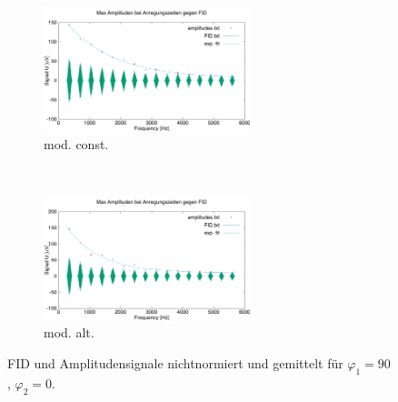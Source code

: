 \documentclass{article}
\begin{document}
        \begin{figure}[H]
            \centering
            \begin{subfigure}[b]{0.4\textwidth}
                \centering
                \includegraphics[width=6cm]{../Bilddateien/CPMG-90-0-constant-avg.png}
                \caption{mod. const.}
                \label{fig:CPMG-90-0-constant-avg}
            \end{subfigure}
            \
            \begin{subfigure}[b]{0.4\textwidth}
                \centering
                \includegraphics[width=6cm]{../Bilddateien/CPMG-90-0-alternating-avg.png}
                \caption{mod. alt.}
                \label{fig:CPMG-90-0-alternating-avg}
            \end{subfigure}
            \caption{FID und Amplitudensignale nichtnormiert und gemittelt für $\varphi_1 = 90$, $\varphi_2 = 0$.}
            \label{fig:CPMG-90-0-avg}
        \end{figure}
\end{document}
